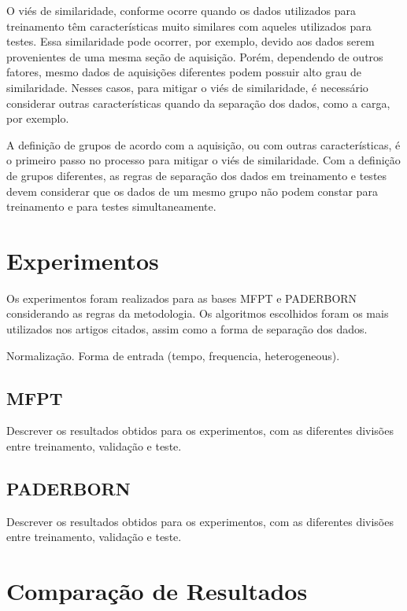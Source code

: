 \documentclass[conference]{IEEEtran}
\begin{document}
O viés de similaridade, conforme \cite{b4} ocorre quando os dados utilizados para treinamento têm características muito similares com aqueles utilizados para testes. 
Essa similaridade pode ocorrer, por exemplo, devido aos dados serem provenientes de uma mesma seção de aquisição.
Porém, dependendo de outros fatores, mesmo dados de aquisições diferentes podem possuir alto grau de similaridade.
Nesses casos, para mitigar o viés de similaridade, é necessário considerar outras características quando da separação dos dados, como a carga, por exemplo.

A definição de grupos de acordo com a aquisição, ou com outras características, é o primeiro passo no processo para mitigar o viés de similaridade.
Com a definição de grupos diferentes, as regras de separação dos dados em treinamento e testes devem considerar que os dados de um mesmo grupo não podem constar para treinamento e para testes simultaneamente.


\section{Experimentos}

Os experimentos foram realizados para as bases MFPT e PADERBORN considerando as regras da metodologia.
Os algoritmos escolhidos foram os mais utilizados nos artigos citados, assim como a forma de separação dos dados.

Normalização.
Forma de entrada (tempo, frequencia, heterogeneous).


\subsection{MFPT}

Descrever os resultados obtidos para os experimentos, com as diferentes divisões entre treinamento, validação e teste.



\subsection{PADERBORN}

Descrever os resultados obtidos para os experimentos, com as diferentes divisões entre treinamento, validação e teste.

\section{Comparação de Resultados}
\end{document}
